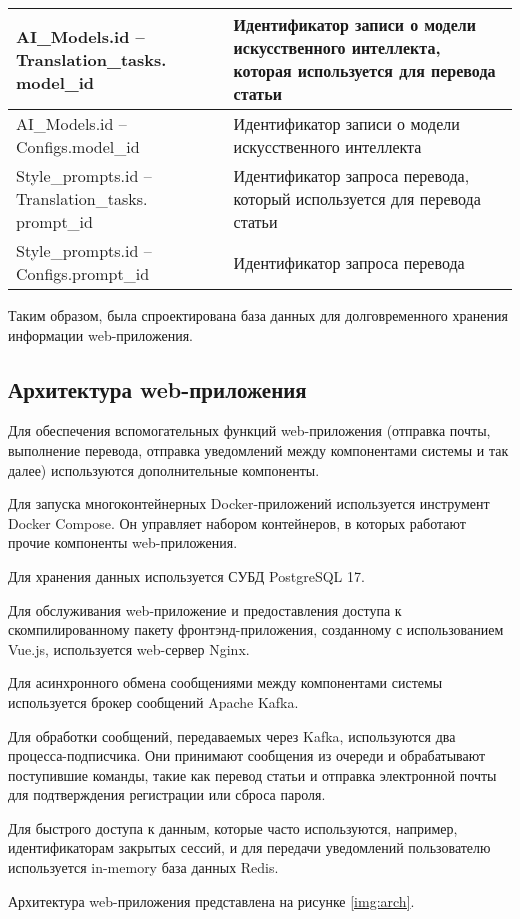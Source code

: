 \documentclass[14pt]{extarticle}
\begin{document}
\begin{longtable}{|p{8cm}|p{8cm}|}
    AI\_Models.id -- Translation\_tasks. model\_id & Идентификатор записи о модели искусственного интеллекта, которая используется для перевода статьи \\ \hline
    AI\_Models.id -- Configs.model\_id & Идентификатор записи о модели искусственного интеллекта \\ \hline
    Style\_prompts.id -- Translation\_tasks. prompt\_id & Идентификатор запроса перевода, который используется для перевода статьи \\ \hline
    Style\_prompts.id -- Configs.prompt\_id & Идентификатор запроса перевода \\ \hline
\end{longtable}

Таким образом, была спроектирована база данных для долговременного хранения информации web-приложения.

\subsection{Архитектура web-приложения}

Для обеспечения вспомогательных функций web-приложения (отправка почты, выполнение перевода, отправка уведомлений между компонентами системы и так далее) используются дополнительные компоненты.

Для запуска многоконтейнерных Docker-приложений используется инструмент Docker Compose. Он управляет набором контейнеров, в которых работают прочие компоненты web-приложения.

Для хранения данных используется СУБД PostgreSQL 17.

Для обслуживания web-приложение и предоставления доступа к скомпилированному пакету фронтэнд-приложения, созданному с использованием Vue.js, используется web-сервер Nginx.

Для асинхронного обмена сообщениями между компонентами системы используется брокер сообщений Apache Kafka.

Для обработки сообщений, передаваемых через Kafka, используются два процесса-подписчика. Они принимают сообщения из очереди и обрабатывают поступившие команды, такие как перевод статьи и отправка электронной почты для подтверждения регистрации или сброса пароля.

Для быстрого доступа к данным, которые часто используются, например, идентификаторам закрытых сессий, и для передачи уведомлений пользователю используется in-memory база данных Redis.

Архитектура web-приложения представлена на рисунке \ref{img:arch}.
\end{document}
